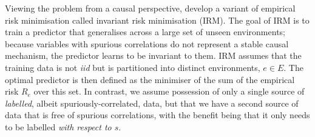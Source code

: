 Viewing the problem from a causal perspective, \citet{arjovsky2019invariant} develop a variant of empirical risk minimisation called invariant risk minimisation (IRM).
The goal of IRM is to train a predictor that generalises across a large set of unseen environments; because variables with spurious correlations do not represent a stable causal mechanism, the predictor learns to be invariant to them. IRM assumes that the training data is not \emph{iid} but is partitioned into distinct environments, $e \in E$. The optimal predictor is then defined as the minimiser of the sum of the empirical risk $R_e$ over this set. In contrast, we assume possession of only a single source of \emph{labelled}, albeit spuriously-correlated, data, but that we have a second source of data that is free of spurious correlations, with the benefit being that it only needs to be labelled \emph{with respect to $s$}.


